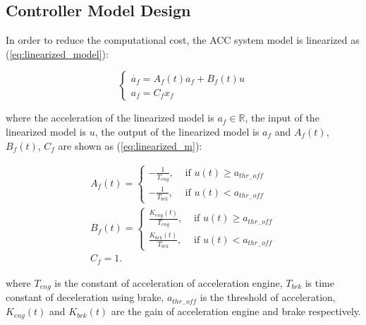 \documentclass{article}
\numberwithin{equation}{section}
\begin{document}
\subsection{Controller Model Design}
In order to reduce the computational cost, the ACC system model is linearized
as (\ref{eq:linearized_model}):

\begin{equation}
    \left\{\begin{array}{l}\label{eq:linearized_model}
        \dot{a_f}=A_f(t)a_f+B_f(t)u \\
        a_f=C_fx_f
    \end{array}\right.
\end{equation}

\noindent where the acceleration of the linearized model is $a_f\in \mathbb{R}$, the input of the
linearized model is $u$, the output of the linearized model is $a_f$ and $A_f(t)$, $B_f(t)$, $C_f$ are
shown as (\ref{eq:linearized_m}):

\begin{equation}
    \begin{array}{l}\label{eq:linearized_m}
        A_{f}(t)=\left\{\begin{array}{ll}
                            -\frac{1}{T_{e n g}}, & \text { if } u(t) \geq a_{t h r_{-} o f f} \\
                            -\frac{1}{T_{b r k}}, & \text { if } u(t)<a_{t h r_{-} o f f}
                        \end{array}\right.                                  \\
        B_{f}(t)=\left\{\begin{array}{ll}
                            \frac{K_{e n g}(t)}{T_{e n g}}, & \text { if } u(t) \geq a_{t h r_{-} o f f} \\
                            \frac{K_{b r k}(t)}{T_{b r k}}, & \text { if } u(t)<a_{t h r_{-} o f f}
                        \end{array}\right. \\
        C_{f}=1 .
    \end{array}
\end{equation}

\noindent where $T_{e n g}$ is the constant of acceleration of acceleration engine,
$T_{b r k}$ is time constant of deceleration using brake, $a_{t h r_{-} o f f}$ is the threshold
of acceleration, $K_{e n g}(t)$ and $K_{b r k}(t)$ are the gain of acceleration engine and brake
respectively.
\end{document}
